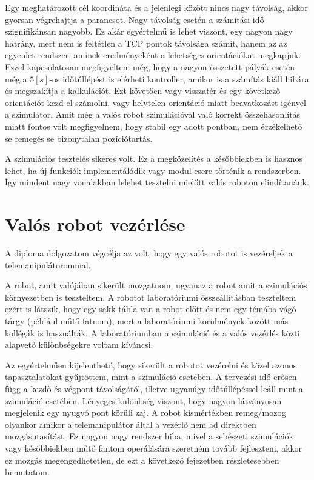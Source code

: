 
Egy meghatározott cél koordináta és a jelenlegi között nincs nagy távolság, akkor gyorsan végrehajtja a parancsot. Nagy távolság esetén a számítási idő szignifikánsan nagyobb. Ez akár egyértelmű is lehet viszont, egy nagyon nagy hátrány, mert nem is feltétlen a TCP pontok távolsága számít, hanem az az egyenlet rendszer, aminek eredményeként a lehetséges orientációkat megkapjuk. Ezzel kapcsolatosan megfigyeltem még, hogy a nagyon összetett pályák esetén még a $5[s]$-os időtúllépést is elérheti kontroller, amikor is a számítás kiáll hibára és megszakítja a kalkulációt. Ezt követően vagy visszatér és egy következő orientációt kezd el számolni, vagy helytelen orientáció miatt beavatkozást igényel a szimulátor. Amit még a valós robot szimulációval való korrekt összehasonlítás miatt fontos volt megfigyelnem, hogy stabil egy adott pontban, nem érzékelhető se remegés se bizonytalan pozíciótartás.

A szimulációs tesztelés sikeres volt. Ez a megközelítés a későbbiekben is hasznos lehet, ha új funkciók implementálódik vagy modul csere történik a rendszerben. Így mindent nagy vonalakban lelehet tesztelni mielőtt valós roboton elindítanánk.


\section{Valós robot vezérlése}

A diploma dolgozatom végcélja az volt, hogy egy valós robotot is vezéreljek a telemanipulátorommal. 

A robot, amit valójában sikerült mozgatnom, ugyanaz a robot amit a szimulációs környezetben is teszteltem. A robotot laboratóriumi összeállításban teszteltem ezért is látszik, hogy egy sakk tábla van a robot előtt és nem egy témába vágó tárgy (például műtő fatnom), mert a laboratóriumi körülmények között más kollégák is használták. A laboratóriumban a szimuláció és a valós vezérlés közti alapvető különbségekre voltam kíváncsi.


Az egyértelműen kijelenthető, hogy sikerült a robotot vezérelni és közel azonos tapasztalatokat gyűjtöttem, mint a szimuláció esetében. A tervezési idő erősen függ a kezdő és végpont távolságától, illetve ugyanúgy időtúllépéssel leáll mint a szimuláció esetében. Lényeges különbség viszont, hogy nagyon látványosan megjelenik egy nyugvó pont körüli zaj. A robot kismértékben remeg/mozog olyankor amikor a telemanipulátor által a vezérlő nem ad direktben mozgásutasítást. Ez nagyon nagy rendszer hiba, mivel a sebészeti szimulációk vagy későbbiekben műtő fantom operálására szeretném tovább fejleszteni, akkor ez mozgás megengedhetetlen, de ezt a következő fejezetben részletesebben bemutatom.

